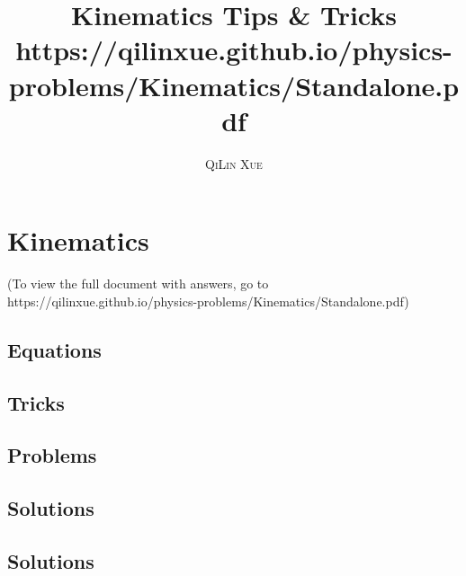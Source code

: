 \documentclass[a4paper,11pt,oneside]{book}
\title{\Huge \textbf{Kinematics Tips \& Tricks} \\ \huge https://qilinxue.github.io/physics-problems/Kinematics/Standalone.pdf}
\author{\textsc{QiLin Xue}}
\begin{document}
\maketitle
\tableofcontents

\chapter{Kinematics}
(To view the full document with answers, go to https://qilinxue.github.io/physics-problems/Kinematics/Standalone.pdf)



\section{Equations}


\section{Tricks}


\newpage
\section{Problems}


\newpage
\section{Solutions}
\printsolutions[chapter]

\newpage
\section{Solutions}
\printsolutions[chapter]
\end{document}
